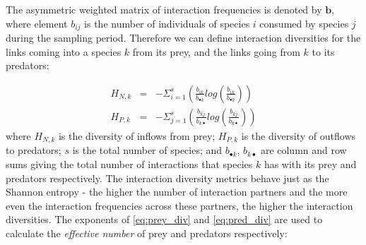 The asymmetric weighted matrix of interaction frequencies is denoted by $\mathbf{b}$, where element $b_{ij}$ is the number of individuals of species $i$ consumed by species $j$ during the sampling period. Therefore we can define interaction diversities for the links coming into a species $k$ from its prey, and the links going from $k$ to its predators:  

\begin{eqnarray}
H_{N,k} &=& -\Sigma_{i=1}^{s} \left( \frac{b_{ik}}{b_{\bullet k}} log \left( \frac{b_{ik}}{b_{\bullet k}} \right) \right) \label{eq:prey_div} \\
H_{P,k} &=& -\Sigma_{j=1}^{s} \left( \frac{b_{kj}}{b_{k\bullet}} log \left( \frac{b_{kj}}{b_{k\bullet}} \right) \right) \label{eq:pred_div}
\end{eqnarray}
%
where $H_{N,k}$ is the diversity of inflows from prey; $H_{P,k}$ is the diversity of outflows to predators; $s$ is the total number of species; and $b_{\bullet k}$, $b_{k\bullet}$ are column and row sums giving the total number of interactions that species $k$ has with its prey and predators respectively. The interaction diversity metrics behave just as the Shannon entropy - the higher the number of interaction partners and the more even the interaction frequencies across these partners, the higher the interaction diversities. The exponents of \eqref{eq:prey_div} and \eqref{eq:pred_div} are used to calculate the \emph{effective number} of prey and predators respectively:

